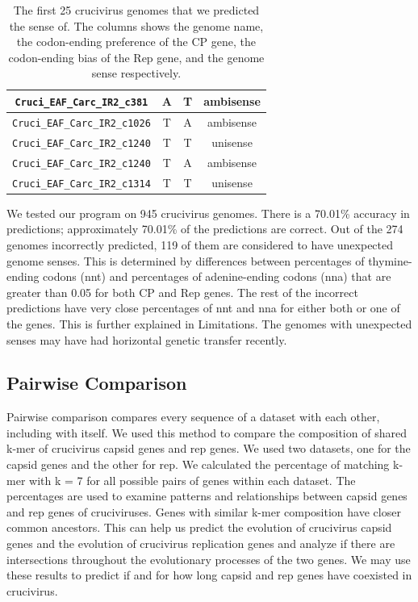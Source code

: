 \documentclass[eng]{ajceam-class}
\begin{document}
\begin{table}
\begin{center}
\begin{tabular}{||c c c c||}
    \hline
    \texttt{Cruci\_EAF\_Carc\_IR2\_c381} & A & T & ambisense \\
    \hline
    \texttt{Cruci\_EAF\_Carc\_IR2\_c1026} & T & A & ambisense \\
    \hline
    \texttt{Cruci\_EAF\_Carc\_IR2\_c1240} & T & T & unisense \\
    \hline
    \texttt{Cruci\_EAF\_Carc\_IR2\_c1240} & T & A & ambisense \\
    \hline
    \texttt{Cruci\_EAF\_Carc\_IR2\_c1314} & T & T & unisense \\ [1ex]
    \hline
\end{tabular}
\caption{The first 25 crucivirus genomes that we predicted the sense of. The columns shows the genome name, the codon-ending preference of the CP gene, the codon-ending bias of the Rep gene, and the genome sense respectively.}
\end{center}
\end{table}

We tested our program on 945 crucivirus genomes. There is a 70.01\% accuracy in predictions; approximately 70.01\% of the predictions are correct. Out of the 274 genomes incorrectly predicted, 119 of them are considered to have unexpected genome senses. This is determined by differences between percentages of thymine-ending codons (nnt) and percentages of adenine-ending codons (nna) that are greater than 0.05 for both CP and Rep genes. The rest of the incorrect predictions have very close percentages of nnt and nna for either both or one of the genes. This is further explained in Limitations. The genomes with unexpected senses may have had horizontal genetic transfer recently.

\subsection{Pairwise Comparison}

Pairwise comparison compares every sequence of a dataset with each other, including with itself. We used this method to compare the composition of shared k-mer of crucivirus capsid genes and rep genes. We used two datasets, one for the capsid genes and the other for rep. We calculated the percentage of matching k-mer with k = 7 for all possible pairs of genes within each dataset. The percentages are used to examine patterns and relationships between capsid genes and rep genes of cruciviruses. Genes with similar k-mer composition have closer common ancestors. This can help us predict the evolution of crucivirus capsid genes and the evolution of crucivirus replication genes and analyze if there are intersections throughout the evolutionary processes of the two genes. We may use these results to predict if and for how long capsid and rep genes have coexisted in crucivirus.
\end{document}
